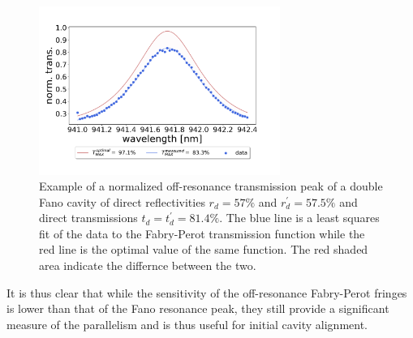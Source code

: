 \begin{figure}[h!]
    \centering
    \includegraphics[width=0.7\textwidth]{figures/parallelism_plot.pdf}
    \caption{Example of a normalized off-resonance transmission peak of a double Fano cavity of direct reflectivities $r_d = 57\%$ and $r_d^{\prime}=57.5\%$ and direct transmissions $t_d = t_d^{\prime} = 81.4\%$. The blue line is a least squares fit of the data to the Fabry-Perot transmission function while the red line is the optimal value of the same function. The red shaded area indicate the differnce between the two.}
    \label{fig:parallelism_plot}
\end{figure}

It is thus clear that while the sensitivity of the off-resonance Fabry-Perot fringes is lower than that of the Fano resonance peak, they still provide a significant measure of the parallelism and is thus useful for initial cavity alignment.
